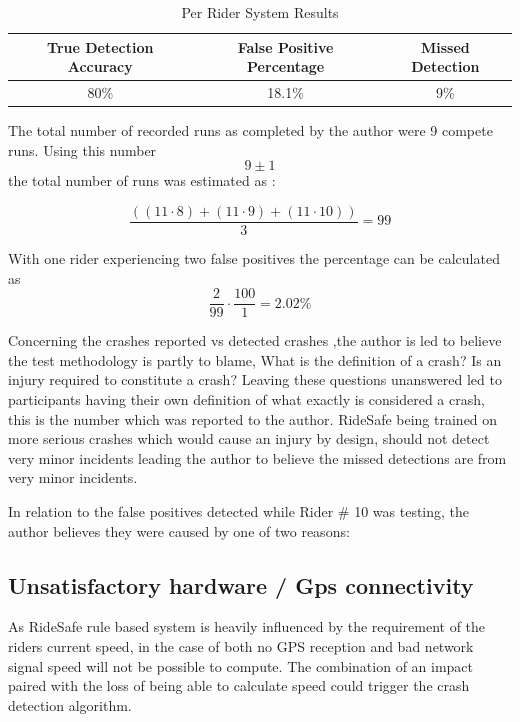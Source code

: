 \vspace{2cm}

\begin{table}
\caption{Per Rider System Results}
\label{sr}
\begin{center}
 \begin{tabular}{||c| c|  c||} 
 \hline
 True Detection Accuracy & False Positive Percentage & Missed Detection \\ [0.5ex] 
 \hline\hline
  80\% & 18.1\% & 9\% \\ [1ex] 
 \hline
\end{tabular}
\end{center}
\end{table}




The total number of recorded runs as completed by the author were 9 compete runs.
Using this number \[ 9 \pm 1 \] the total number of runs was estimated as : 


\[ \frac{((11\cdot8) + (11\cdot9) + (11\cdot10))}{3} = 99 \]

With one rider experiencing two false positives the percentage can be calculated as \[ \frac{2}{99} \cdot \frac{100}{1} = 2.02\% \] 









Concerning the crashes reported vs detected crashes ,the author is led to believe the  test methodology is partly to blame, What is the definition of a crash? Is an injury required to constitute a crash?  Leaving these questions unanswered led to participants having their own definition of what exactly is considered a crash, this is the number which was reported to the author. RideSafe being trained on more serious crashes which would cause an injury by design, should not detect very minor incidents leading the author to believe the missed detections are from very minor incidents.

In relation to the false positives detected while Rider \# 10 was testing, the author believes they were caused by one of two reasons:

\subsection *{Unsatisfactory hardware / Gps connectivity}

As RideSafe rule based system is heavily influenced by the requirement of the riders current speed, in the case of both no GPS reception and bad network signal speed will not be possible to compute. The combination of an impact paired with the loss of being able to calculate speed could trigger the crash detection algorithm.


